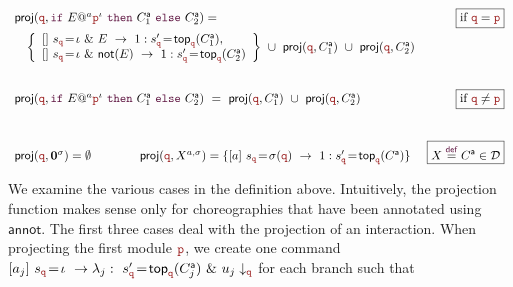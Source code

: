 \begin{definition}
\begin{displaymath}
\begin{array}{lr}
      \proj (\nrr,\ifTEl {E}a{\nr^\iota}{\anno C_1}{\anno C_2}) = 
      &  \boxed{\text{if }\nrr=\nr}\\[2mm]
      \quad\left\{ 
      \begin{array}{lll}
        \commandBase {} {s_{\nrr}\!=\! \iota\ \&\ E}{\ 1: s'_{\nrr}\!=\!
        \mathsf{top}_{\nrr}(\anno C_1)},\\ 
        \commandBase {} {s_{\nrr}\!=\! \iota\ \&\ \mathsf{not}(E)}
        {\ 1: s'_{\nrr}\!=\! \mathsf{top}_{\nrr}(\anno C_2)}
      \end{array}
      \right\}
      \ \cup\ \proj (\nrr, \anno C_1)
      \ \cup\
      \proj (\nrr, \anno C_2)
      \\[1cm]

      \proj (\nrr,\ifTEl {E}a{\nr^\iota}{\anno C_1}{\anno C_2}) \ =\
      \proj (\nrr, \anno C_1)
      \ \cup\
      \proj (\nrr, \anno C_2)
      &  \boxed{\text{if }\nrr\neq\nr}
      \\[1cm]

      \proj (\nrr,\CEnd^{\sigma}) = \emptyset
      \qquad\qquad
      \proj (\nrr, X^{a,\sigma}) = 
      \{ \commandBase {a} {s_{\nrr}\!=\! \sigma(\nrr)}{\ 1: s'_{\nrr}\!=\! } \mathsf{top}_{\nrr}(\anno C)\}
      &\boxed{X\stackrel{\textcolor{sh_keyword}{\mathsf{def}}}{=}
        \anno C\in\defin}
    \end{array}
  \end{displaymath}
\end{definition}
We examine the various cases in the definition above. Intuitively, the
projection function makes sense only for choreographies that have been
annotated using $\mathsf{annot}$. The first three cases deal with the
projection of an interaction.
%
When projecting the first module $\nr$, we create one command
$\commandBase {a_j} {s_{\nrr}\!=\! \iota} {\lambda_j:\ s_{\role
    q}'\!=\!  \topannotation \nrr{\anno C_j}}\ \&\ \projE {u_j}{\nrr}$
for each branch such that
% 
